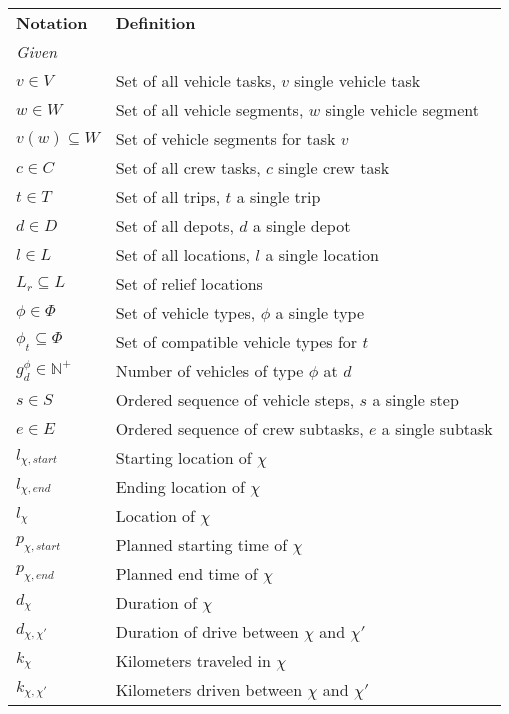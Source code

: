 \documentclass[]{article}
\begin{document}
\begin{table}
  \centering
  \begin{tabular}{ll}
    \toprule
    \multicolumn{1}{l}{\textbf{Notation}} & \multicolumn{1}{l}{\textbf{Definition}}               \\
    \cmidrule(lr){1-1}\cmidrule(lr){2-2}
    \multicolumn{2}{l}{\textit{Given}} \\
    $v \in V$ & Set of all vehicle tasks, $v$ single vehicle task \\
    $w \in W$ & Set of all vehicle segments, $w$ single vehicle segment \\
    $v(w) \subseteq W$ & Set of vehicle segments for task $v$ \\ 
    $c \in C$ & Set of all crew tasks, $c$ single crew task \\
    $t \in T$ & Set of all trips, $t$ a single trip \\
    $d \in D$ & Set of all depots, $d$ a single depot \\
    $l \in L$ & Set of all locations, $l$ a single location \\
    $L_r \subseteq L$ & Set of relief locations \\ 
    $\phi \in \Phi$ & Set of vehicle types, $\phi$ a single type \\
    $\phi_t \subseteq \Phi$ & Set of compatible vehicle types for $t$ \\
    $g^\phi_{d} \in \mathbb{N}^+$ & Number of vehicles of type $\phi$ at $d$ \\
    $s \in S$ & Ordered sequence of vehicle steps, $s$ a single step \\ 
    $e \in E$ & Ordered sequence of crew subtasks, $e$ a single subtask \\ 
    $l_{\chi,start}$ & Starting location of $\chi$ \\
    $l_{\chi,end}$ & Ending location of $\chi$ \\ 
    $l_{\chi} $ & Location of $\chi$ \\
    $p_{\chi,start}$ & Planned starting time of $\chi$ \\
    $p_{\chi,end}$ & Planned end time of $\chi$ \\
    $d_{\chi}$ & Duration of $\chi$ \\ 
    $d_{\chi,\chi'}$ & Duration of drive between $\chi$ and $\chi'$ \\
    $k_{\chi}$ & Kilometers traveled in $\chi$ \\
    $k_{\chi,\chi'}$ & Kilometers driven between $\chi$ and $\chi'$ \\

\end{tabular}
\end{table}
\end{document}
